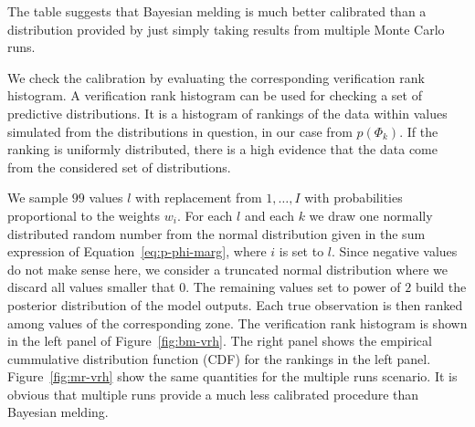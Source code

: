 \documentclass[11pt, fleqn]{article}
\begin{document}
The table suggests that Bayesian melding is much better calibrated than a
distribution provided by just simply taking results from multiple Monte Carlo
runs. 

We check the calibration by evaluating the corresponding verification rank
histogram. A verification rank histogram can be used for checking a set of
predictive distributions. It is a histogram of rankings of the data within
values simulated from the distributions in question, in our case from
$p(\Phi_k)$. If the ranking is uniformly distributed, there is a high evidence
that the data come from the considered set of distributions.

We sample $99$ values $l$ with replacement from $1,\dots,I$ with probabilities
proportional to the weights $w_i$. For each $l$ and each $k$ we draw one
normally distributed random number from the normal distribution given in the
sum expression of Equation~\ref{eq:p-phi-marg}, where $i$ is set to $l$. Since
negative values do not make sense here, we consider a truncated normal
distribution where we discard all values smaller that 0.  The remaining values
set to power of $2$ build the posterior distribution of the model
outputs. Each true observation is then ranked among values of the
corresponding zone. The verification rank histogram is shown in the left panel
of Figure~\ref{fig:bm-vrh}. The right panel shows the empirical cummulative
distribution function (CDF) for the rankings in the left
panel. Figure~\ref{fig:mr-vrh} show the same quantities for the multiple runs
scenario. It is obvious that multiple runs provide a much less calibrated
procedure than Bayesian melding. 
\end{document}
